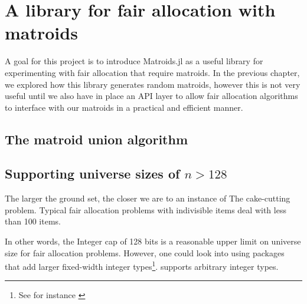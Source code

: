 \chapter{A library for fair allocation with matroids}
A goal for this project is to introduce Matroids.jl as a useful library for experimenting with fair allocation that require matroids. In the previous chapter, we explored how this library generates random matroids, however this is not very useful until we also have in place an API layer to allow fair allocation algorithms to interface with our matroids in a practical and efficient manner.





\skelpars[5]

\section{The matroid union algorithm}
\skelpars[7]


\section{Supporting universe sizes of \texorpdfstring{$n > 128$}{n > 128}}
The larger the ground set, the closer we are to an instance of The cake-cutting problem. Typical fair allocation problems with indivisible items deal with less than 100 items. 

In other words, the Integer cap of 128 bits is a reasonable upper limit on universe size for fair allocation problems. However, one could look into using packages that add larger fixed-width integer types\footnote{See for instance \href{https://github.com/rfourquet/BitIntegers.jl}{}}.  supports arbitrary integer types. 